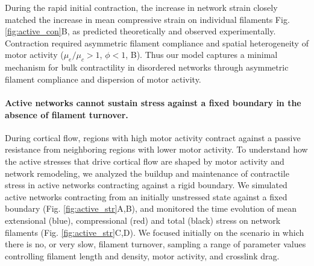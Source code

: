 \documentclass[10pt,letterpaper]{article}
\begin{document}
During the rapid initial contraction, the increase in network strain closely matched the increase in mean compressive strain on individual filaments Fig. \ref{fig:active_con}B, as predicted theoretically \cite{1367-2630-14-3-033037,PhysRevX.4.041002} and observed experimentally\cite{rheo_2D1}. Contraction required asymmetric filament compliance and spatial heterogeneity of motor activity ($\mu_e/\mu_c > 1$, $\phi<1$, B). Thus our model captures a minimal mechanism for bulk contractility in disordered networks through asymmetric filament compliance and dispersion of motor activity. 


\paragraph{Active networks cannot sustain stress against a fixed boundary in the absence of filament turnover.}

During cortical flow, regions with high motor activity contract against a passive resistance from neighboring regions with lower motor activity.  To understand how the active stresses that drive cortical flow are shaped by motor activity and network remodeling, we analyzed the buildup and maintenance of contractile stress in active networks contracting against a rigid boundary. We simulated active networks contracting from an initially unstressed state against a fixed boundary (Fig. \ref{fig:active_str}A,B), and  monitored the time evolution of mean extensional (blue), compressional (red) and total (black) stress on network filaments (Fig. \ref{fig:active_str}C,D). We focused initially on the scenario in which there is no, or very slow, filament turnover, sampling a range of parameter values controlling filament length and density, motor activity, and crosslink drag. 
\end{document}
